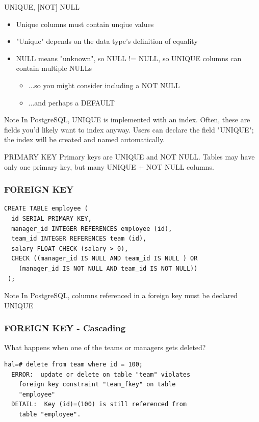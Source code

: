 \documentclass{beamer}
\begin{document}
\begin{frame}{UNIQUE, [NOT] NULL}
    \begin{itemize}
        \item Unique columns must contain unqiue values
        \item "Unique" depends on the data type's definition of equality
        \item NULL means "unknown", so NULL != NULL, so UNIQUE columns can contain multiple NULLs
        \begin{itemize}
            \item ...so you might consider including a NOT NULL
            \item ...and perhaps a DEFAULT
        \end{itemize}
    \end{itemize}
    \begin{block}{Note}
        In PostgreSQL, UNIQUE is implemented with an index. Often, these are
        fields you'd likely want to index anyway. Users can declare the field "UNIQUE";
        the index will be created and named automatically.
    \end{block}
\end{frame}

\begin{frame}{PRIMARY KEY}
    Primary keys are UNIQUE and NOT NULL. Tables may have only one primary key, but many UNIQUE + NOT NULL columns.
\end{frame}

\begin{frame}[fragile]
    \frametitle{FOREIGN KEY}
    \begin{Verbatim}[fontfamily=courier]
CREATE TABLE employee (
  id SERIAL PRIMARY KEY,
  manager_id INTEGER REFERENCES employee (id),
  team_id INTEGER REFERENCES team (id),
  salary FLOAT CHECK (salary > 0),
  CHECK ((manager_id IS NULL AND team_id IS NULL ) OR
    (manager_id IS NOT NULL AND team_id IS NOT NULL))
 );
    \end{Verbatim}
    \begin{block}{Note} In PostgreSQL, columns referenced in a foreign key must be declared UNIQUE
    \end{block}
\end{frame}

\begin{frame}[fragile]
    \frametitle{FOREIGN KEY - Cascading}
    What happens when one of the teams or managers gets deleted?
    \begin{Verbatim}[fontfamily=courier]
  hal=# delete from team where id = 100;
  ERROR:  update or delete on table "team" violates
    foreign key constraint "team_fkey" on table
    "employee"
  DETAIL:  Key (id)=(100) is still referenced from
    table "employee".
    \end{Verbatim}
\end{frame}
\end{document}
